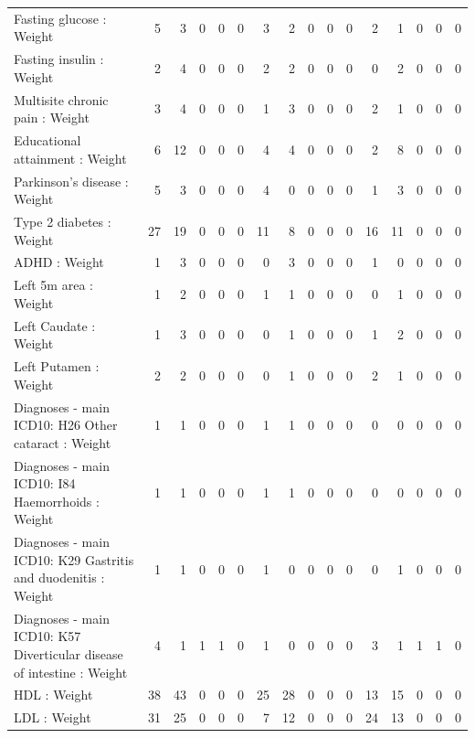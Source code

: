 \begin{table}[ht]
\begin{tabular}{lrrrrrrrrrrrrrrr}
  Fasting glucose : Weight  &   5 &   3 &   0 &   0 &   0 &   3 &   2 &   0 &   0 &   0 &   2 &   1 &   0 &   0 &   0 \\ 
  Fasting insulin : Weight  &   2 &   4 &   0 &   0 &   0 &   2 &   2 &   0 &   0 &   0 &   0 &   2 &   0 &   0 &   0 \\ 
  Multisite chronic pain : Weight  &   3 &   4 &   0 &   0 &   0 &   1 &   3 &   0 &   0 &   0 &   2 &   1 &   0 &   0 &   0 \\ 
  Educational attainment : Weight  &   6 &  12 &   0 &   0 &   0 &   4 &   4 &   0 &   0 &   0 &   2 &   8 &   0 &   0 &   0 \\ 
  Parkinson's disease : Weight  &   5 &   3 &   0 &   0 &   0 &   4 &   0 &   0 &   0 &   0 &   1 &   3 &   0 &   0 &   0 \\ 
  Type 2 diabetes : Weight  &  27 &  19 &   0 &   0 &   0 &  11 &   8 &   0 &   0 &   0 &  16 &  11 &   0 &   0 &   0 \\ 
  ADHD : Weight  &   1 &   3 &   0 &   0 &   0 &   0 &   3 &   0 &   0 &   0 &   1 &   0 &   0 &   0 &   0 \\ 
  Left 5m area : Weight  &   1 &   2 &   0 &   0 &   0 &   1 &   1 &   0 &   0 &   0 &   0 &   1 &   0 &   0 &   0 \\ 
  Left Caudate : Weight  &   1 &   3 &   0 &   0 &   0 &   0 &   1 &   0 &   0 &   0 &   1 &   2 &   0 &   0 &   0 \\ 
  Left Putamen : Weight  &   2 &   2 &   0 &   0 &   0 &   0 &   1 &   0 &   0 &   0 &   2 &   1 &   0 &   0 &   0 \\ 
  Diagnoses - main ICD10: H26 Other cataract : Weight  &   1 &   1 &   0 &   0 &   0 &   1 &   1 &   0 &   0 &   0 &   0 &   0 &   0 &   0 &   0 \\ 
  Diagnoses - main ICD10: I84 Haemorrhoids : Weight  &   1 &   1 &   0 &   0 &   0 &   1 &   1 &   0 &   0 &   0 &   0 &   0 &   0 &   0 &   0 \\ 
  Diagnoses - main ICD10: K29 Gastritis and duodenitis : Weight  &   1 &   1 &   0 &   0 &   0 &   1 &   0 &   0 &   0 &   0 &   0 &   1 &   0 &   0 &   0 \\ 
  Diagnoses - main ICD10: K57 Diverticular disease of intestine : Weight  &   4 &   1 &   1 &   1 &   0 &   1 &   0 &   0 &   0 &   0 &   3 &   1 &   1 &   1 &   0 \\ 
  HDL : Weight  &  38 &  43 &   0 &   0 &   0 &  25 &  28 &   0 &   0 &   0 &  13 &  15 &   0 &   0 &   0 \\ 
  LDL : Weight  &  31 &  25 &   0 &   0 &   0 &   7 &  12 &   0 &   0 &   0 &  24 &  13 &   0 &   0 &   0 \\ 

\end{tabular}
\end{table}
